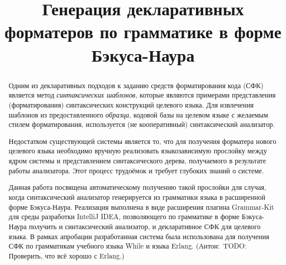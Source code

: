 \documentclass[conference]{IEEEtran}
\newcommand{\app}[1]{{\color{blue}({Антон:\ #1})}\marginpar{!}}
\begin{document}
%
%
\title{Генерация декларативных форматеров по грамматике в форме Бэкуса-Наура}


\author{
\and
{}
}

\maketitle

\begin{abstract}
Одним из декларативных подходов к заданию средств форматирования кода (СФК)
является метод \emph{синтаксических шаблонов}, которые
являются примерами представления (форматирования) синтаксических
конструкций целевого языка.
Для извлечения шаблонов из предоставленного \emph{образца},
кодовой базы на целевом языке с желаемым стилем форматирования,
используется (не кооперативный) синтаксический анализатор. 

Недостатком существующей системы является то, что 
для получения форматера нового целевого языка
необходимо вручную реализовать языкозависимую прослойку между ядром
системы и представлением синтаксического
дерева, получаемого в результате работы анализатора.
Этот процесс трудоёмок и требует глубоких знаний о системе.


Данная работа посвящена автоматическому получению такой прослойки
для случая, когда синтаксический анализатор генерируется из грамматики языка в
расширенной форме Бэкуса-Наура.
Реализация выполнена в виде расширения плагина Grammar-Kit
для среды разработки IntelliJ IDEA, позволяющего
по грамматике в форме Бэкуса-Наура получить и синтаксический анализатор,
и декларативное СФК для целевого языка.
В рамках апробации разработанная система была использована
для получения СФК по грамматикам учебного языка While
и языка Erlang.
\app{TODO: Проверить, что всё хорошо с Erlang.}
\end{abstract}
\end{document}
